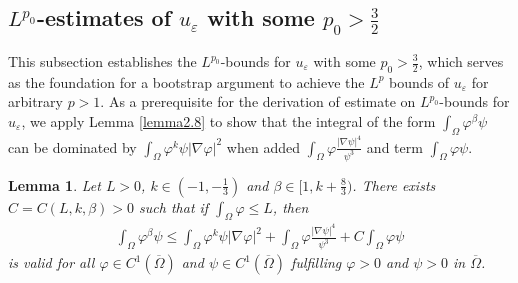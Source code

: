 \documentclass[12pt]{article}
\theoremstyle{plain}
\newtheorem{lemma}{Lemma}[section]
\theoremstyle{definition}
\numberwithin{equation}{section}
\begin{document}
\subsection{ $L^{p_0}$-estimates of $u_{\varepsilon}$ with some $p_0>\frac{3}{2}$}

This subsection establishes the $L^{p_0}$-bounds for $u_{\varepsilon}$ with some $p_0>\frac{3}{2}$, which serves as the foundation for a bootstrap argument to achieve  the $L^{p}$ bounds of  $u_{\varepsilon}$ for arbitrary $p>1$.
As a prerequisite for the derivation of estimate on $L^{p_0}$-bounds for $u_{\varepsilon}$, we apply  Lemma \ref{lemma2.8} to show
that  the integral of the form
$\int_{\Omega}\varphi^{\beta}\psi$  can be dominated by
$\int_{\Omega}\varphi^{k}\psi|\nabla \varphi|^2$ when added $
    \int_{\Omega}\varphi\frac{|\nabla \psi|^4}{\psi^3}
$ %
and term $\int_{\Omega}  \varphi \psi$.
\begin{lemma}\label{lemma3.5} Let $L>0$, $k\in(-1,-\frac{1}{3})$ and $\beta\in[1,k+\frac{8}{3})$. There exists $C=C(L,k, \beta)>0$ such that
if  $\int_{\Omega}\varphi\leq L$, then
  \begin{align}\label{3.10}
    \int_{\Omega}\varphi^{\beta}\psi\leq  \int_{\Omega}\varphi^{k}\psi|\nabla \varphi|^2+\int_{\Omega}\varphi\frac{|\nabla \psi|^4}{\psi^3}+C\int_{\Omega}\varphi \psi
\end{align} is valid for all $\varphi\in C^1(\overline \Omega)$ and $\psi \in C^1(\overline \Omega)$ fulfilling $\varphi> 0$ and $\psi>0$ in $\overline \Omega$.
\end{lemma}
\end{document}
